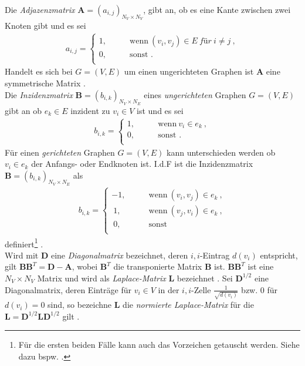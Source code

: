 \documentclass[12pt, a4paper]{report}
\begin{document}
Die \textit{Adjazenzmatrix} $\textbf{A}=(a_{i,j})_{N_V \times N_V}$, gibt an, ob es eine Kante zwischen zwei Knoten gibt und es sei 
\begin{align}
a_{i,j} = \begin{cases}
1, \qquad &\text{wenn} \ (v_i,v_j) \in E \ \textit{für} \ i \neq j \ ,\\
0, \qquad &\text{sonst \ .}\\
\end{cases}
\end{align}
Handelt es sich bei $G=(V,E)$ um einen ungerichteten Graphen ist $\textbf{A}$ eine symmetrische Matrix \cite{kolaczyk2009statistical}.\\
Die \textit{Inzidenzmatrix} $\textbf{\~B}=(b_{i,k})_{N_V \times N_E}$ eines \textit{ungerichteten} Graphen $G=(V,E)$ gibt an ob $e_k \in E$ inzident zu $v_i \in V$ ist \cite{kolaczyk2009statistical} und es sei
\begin{align}
b_{i,k} = \begin{cases}
1, \qquad &\text{wenn} \ v_i \in e_k \ ,\\
0, \qquad &\text{sonst .}\\
\end{cases}
\end{align}
Für einen \textit{gerichteten} Graphen $G=(V,E)$ kann unterschieden werden ob $v_i \in e_k$ der Anfangs- oder Endknoten ist. \mbox{I.d.F} ist die Inzidenzmatrix $\textbf{B}=(b_{i,k})_{N_V \times N_E}$ als
\begin{align}
b_{i,k} = \begin{cases}
-1, \qquad &\text{wenn} \ (v_i,v_j) \in e_k \ ,\\
\ 1, \qquad &\text{wenn} \ (v_j,v_i) \in e_k \ ,\\
\ 0, \qquad &\text{sonst}\\
\end{cases}
\end{align}
definiert\footnote{Für die ersten beiden Fälle kann auch das Vorzeichen getauscht werden. Siehe dazu bspw. .} \cite{brandes2005graphfunda}.\\
Wird mit $\textbf{D}$ eine \textit{Diagonalmatrix} bezeichnet, deren $i,i$-Eintrag $d(v_i)$ entspricht, gilt $\textbf{BB}^T=\textbf{D}-\textbf{A}$, wobei $\textbf{B}^T$ die transponierte Matrix $\textbf{B}$ ist. $\textbf{BB}^T$ ist eine $N_V \times N_V$ Matrix und wird als \textit{Laplace-Matrix} $\textbf{L}$ bezeichnet \cite{kolaczyk2009statistical}. Sei $\textbf{D}^{1/2}$ eine Diagonalmatrix, deren Einträge für $v_i \in V$ in der $i,i$-Zelle $\frac{1}{\sqrt{d(v_i)}}$ bzw. $0$ für $d(v_i)=0$ sind, so bezeichne $\textbf{\~L}$ die \textit{normierte Laplace-Matrix} für die $\textbf{\~L}=\textbf{D}^{1/2}\textbf{L}\textbf{D}^{1/2}$ gilt \cite{brandes2005graphfunda}.\\ 
\end{document}
